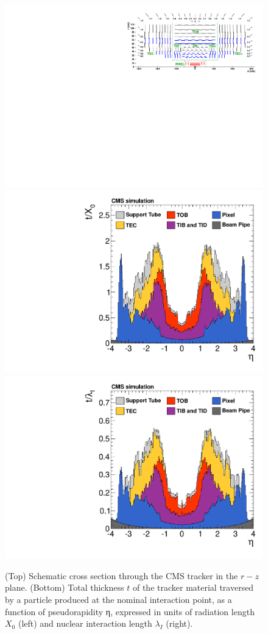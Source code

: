 \begin{figure}\centering
\includegraphics[width=.9\textwidth]{figs/cms/TrackerLayoutNew.pdf}\\
\includegraphics[width=.45\textwidth]{figs/cms/MaterialBudget_RadLengths.pdf}
\includegraphics[width=.45\textwidth]{figs/cms/MaterialBudget_InteractionLengths.pdf}
\caption{(Top) Schematic cross section through the CMS tracker in the $r-z$
  plane. (Bottom) Total thickness $t$ of the tracker material
  traversed by a particle produced at the nominal interaction point,
  as a function of pseudorapidity η, expressed in units of radiation
  length $X_0$ (left) and nuclear interaction length $\lambda_I$
  (right). \label{fig:tracker}}
\end{figure}

